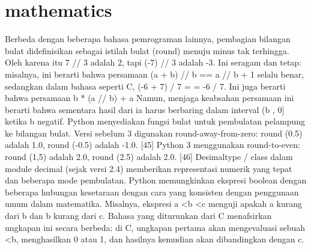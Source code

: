       	\section {mathematics}
	Berbeda dengan beberapa bahasa pemrograman lainnya, pembagian bilangan bulat didefinisikan sebagai istilah bulat (round) menuju minus tak terhingga. 
	Oleh karena itu 7 // 3 adalah 2, tapi (-7) // 3 adalah -3. Ini seragam dan tetap: misalnya, ini berarti bahwa persamaan (a + b) // b == a // b + 1 selalu benar, 
	sedangkan dalam bahasa seperti C, (-6 + 7) / 7 = = -6 / 7. Ini juga berarti bahwa persamaan b * (a // b) + a%
	Namun, menjaga keabsahan persamaan ini berarti bahwa sementara hasil dari%
	ia harus berbaring dalam interval (b , 0] ketika b negatif.
	Python menyediakan fungsi bulat untuk pembulatan pelampung ke bilangan bulat. Versi sebelum 3 digunakan round-away-from-zero: round (0.5) adalah 1.0, round (-0.5) adalah -1.0. [45] Python 3 menggunakan round-to-even: round (1,5) adalah 2.0, round (2.5) adalah 2.0. [46] Desimaltype / class dalam module decimal (sejak versi 2.4) memberikan representasi numerik yang tepat dan beberapa mode pembulatan.
	Python memungkinkan ekspresi boolean dengan beberapa hubungan kesetaraan dengan cara yang konsisten dengan penggunaan umum dalam matematika. Misalnya, ekspresi a <b <c menguji apakah a kurang dari b dan b kurang dari c. Bahasa yang diturunkan dari C menafsirkan ungkapan ini secara berbeda: di C, ungkapan pertama akan mengevaluasi sebuah <b, menghasilkan 0 atau 1, dan hasilnya kemudian akan dibandingkan dengan c.

